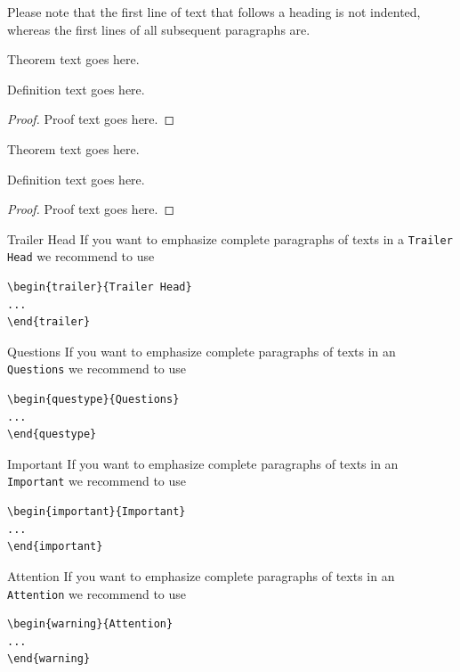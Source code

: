 Please note that the first line of text that follows a heading is not indented, whereas the first lines of all subsequent paragraphs are.

\begin{theorem}
Theorem text goes here.
\end{theorem}
%
%
\begin{definition}
Definition text goes here.
\end{definition}

\begin{proof}
Proof text goes here.
\end{proof}

%
%
\begin{theorem}
Theorem text goes here.
\end{theorem}
%
\begin{definition}
Definition text goes here.
\end{definition}
%
\begin{proof}
Proof text goes here.
\end{proof}
%
%
\begin{trailer}{Trailer Head}
If you want to emphasize complete paragraphs of texts in a \verb|Trailer Head| we recommend to
use  \begin{verbatim}\begin{trailer}{Trailer Head}
...
\end{trailer}\end{verbatim}
\end{trailer}
%
\begin{questype}{Questions}
If you want to emphasize complete paragraphs of texts in an \verb|Questions| we recommend to
use  \begin{verbatim}\begin{questype}{Questions}
...
\end{questype}\end{verbatim}
\end{questype}
%
%
\begin{important}{Important}
If you want to emphasize complete paragraphs of texts in an \verb|Important| we recommend to
use  \begin{verbatim}\begin{important}{Important}
...
\end{important}\end{verbatim}
\end{important}
%
\clearpage
\begin{warning}{Attention}
If you want to emphasize complete paragraphs of texts in an \verb|Attention| we recommend to
use  \begin{verbatim}\begin{warning}{Attention}
...
\end{warning}\end{verbatim}
\end{warning}

